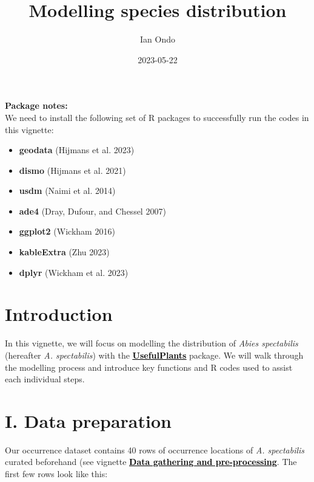 \documentclass[
]{article}
\title{Modelling species distribution}
\author{Ian Ondo}
\date{2023-05-22}
\providecommand{\tightlist}{%
  \setlength{\itemsep}{0pt}\setlength{\parskip}{0pt}}
\begin{document}
\maketitle

{
\setcounter{tocdepth}{2}
\tableofcontents
}
\begin{warningbox}

\textbf{Package notes:}\\
We need to install the following set of R packages to successfully run
the codes in this vignette:

\begin{itemize}
\tightlist
\item
  \textbf{geodata} (Hijmans et al. 2023)
\item
  \textbf{dismo} (Hijmans et al. 2021)
\item
  \textbf{usdm} (Naimi et al. 2014)
\item
  \textbf{ade4} (Dray, Dufour, and Chessel 2007)
\item
  \textbf{ggplot2} (Wickham 2016)
\item
  \textbf{kableExtra} (Zhu 2023)
\item
  \textbf{dplyr} (Wickham et al. 2023)
\end{itemize}

\end{warningbox}

\hypertarget{introduction}{%
\section{Introduction}\label{introduction}}

In this vignette, we will focus on modelling the distribution of
\emph{Abies spectabilis} (hereafter \emph{A. spectabilis}) with the
\href{https://github.com/IanOndo/UsefulPlants}{\textbf{\textcolor{black}{\underline{UsefulPlants}}}}
package. We will walk through the modelling process and introduce key
functions and R codes used to assist each individual steps.

\hypertarget{i.-data-preparation}{%
\section{I. Data preparation}\label{i.-data-preparation}}

Our occurrence dataset contains 40 rows of occurrence locations of
\emph{A. spectabilis} curated beforehand (see vignette
\href{}{\textbf{\textcolor{black}{\underline{Data gathering and pre-processing}}}}.
The first few rows look like this:
\end{document}
